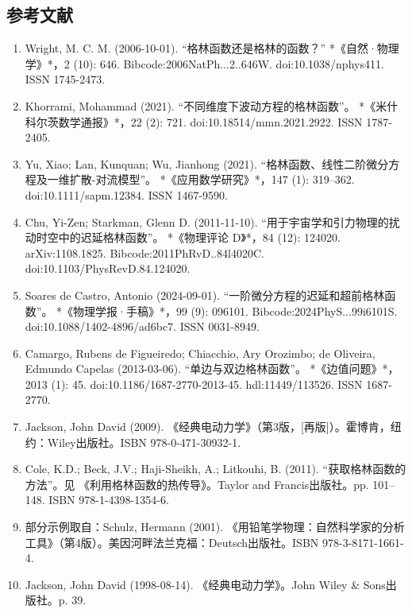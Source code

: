 \subsection{参考文献}
\begin{enumerate}
\item Wright, M. C. M. (2006-10-01). “格林函数还是格林的函数？” *《自然·物理学》*，2 (10): 646. Bibcode:2006NatPh...2..646W. doi:10.1038/nphys411. ISSN 1745-2473.

\item Khorrami, Mohammad (2021). “不同维度下波动方程的格林函数”。 *《米什科尔茨数学通报》*，22 (2): 721. doi:10.18514/mmn.2021.2922. ISSN 1787-2405.

\item Yu, Xiao; Lan, Kunquan; Wu, Jianhong (2021). “格林函数、线性二阶微分方程及一维扩散-对流模型”。 *《应用数学研究》*，147 (1): 319–362. doi:10.1111/sapm.12384. ISSN 1467-9590.

\item Chu, Yi-Zen; Starkman, Glenn D. (2011-11-10). “用于宇宙学和引力物理的扰动时空中的迟延格林函数”。 *《物理评论 D》*，84 (12): 124020. arXiv:1108.1825. Bibcode:2011PhRvD..84l4020C. doi:10.1103/PhysRevD.84.124020.

\item Soares de Castro, Antonio (2024-09-01). “一阶微分方程的迟延和超前格林函数”。 *《物理学报·手稿》*，99 (9): 096101. Bibcode:2024PhyS...99i6101S. doi:10.1088/1402-4896/ad6bc7. ISSN 0031-8949.

\item Camargo, Rubens de Figueiredo; Chiacchio, Ary Orozimbo; de Oliveira, Edmundo Capelas (2013-03-06). “单边与双边格林函数”。 *《边值问题》*，2013 (1): 45. doi:10.1186/1687-2770-2013-45. hdl:11449/113526. ISSN 1687-2770.
\item Jackson, John David (2009). 《经典电动力学》（第3版，[再版]）。霍博肯，纽约：Wiley出版社。ISBN 978-0-471-30932-1.
\item Cole, K.D.; Beck, J.V.; Haji-Sheikh, A.; Litkouhi, B. (2011). “获取格林函数的方法”。见 《利用格林函数的热传导》。Taylor and Francis出版社。pp. 101–148. ISBN 978-1-4398-1354-6.
\item 部分示例取自：Schulz, Hermann (2001). 《用铅笔学物理：自然科学家的分析工具》（第4版）。美因河畔法兰克福：Deutsch出版社。ISBN 978-3-8171-1661-4.
\item Jackson, John David (1998-08-14). 《经典电动力学》。John Wiley & Sons出版社。p. 39.
\end{enumerate}

